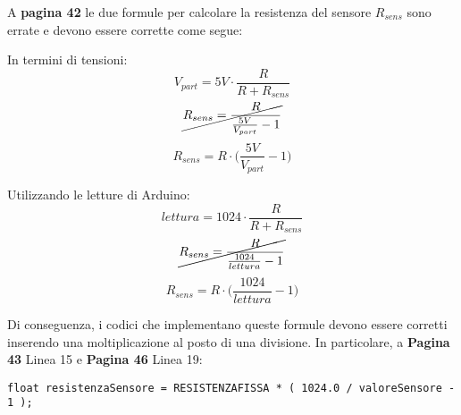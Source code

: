\documentclass[twoside, 12pt]{article}
\begin{document}
\maketitle

A \textbf{pagina 42} le due formule per calcolare la resistenza del sensore $R_{sens}$ sono errate e devono essere corrette come segue:
\begin{multicols}{2}
\centering
In termini di tensioni:
$$ V_{part} = 5V \cdot \frac {R}{R+R_{sens}} $$
\textcolor{red}{$$ \cancel{R_{sens} = \frac {R}{\frac{5V}{V_{part}}-1}} $$}
$$ R_{sens} = R \cdot \bigg( \frac{5V}{V_{part}}-1 \bigg) $$

Utilizzando le letture di Arduino:
$$ lettura = 1024 \cdot \frac {R}{R+R_{sens}} $$
\textcolor{red}{$$ \cancel{R_{sens} = \frac {R}{\frac{1024}{lettura}-1}} $$}
$$ R_{sens} = R \cdot \bigg( \frac{1024}{lettura}-1 \bigg) $$

\end{multicols}

Di conseguenza, i codici che implementano queste formule devono essere corretti inserendo una moltiplicazione al posto di una divisione. In particolare, a \textbf{Pagina 43} Linea 15 e \textbf{Pagina 46} Linea 19:
\begin{lstlisting}[style=Carduino,style=wrap]
  float resistenzaSensore = RESISTENZAFISSA * ( 1024.0 / valoreSensore - 1 );
\end{lstlisting}
\end{document}
